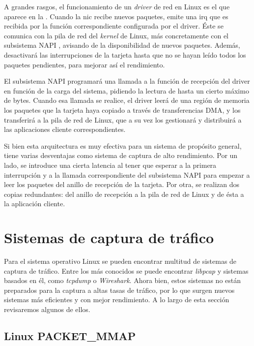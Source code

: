 \documentclass[oneside, draft]{epstfg}
\begin{document}
A grandes rasgos, el funcionamiento de un \textit{\gls{driver}} de red en Linux es el que aparece en la . Cuando la \gls{nic} recibe nuevos paquetes, emite una \gls{irq} que es recibida por la función correspondiente configurada por el \gls{driver}. Éste se comunica con la pila de red del \textit{kernel} de Linux, más concretamente con el subsistema \gls{NAPI} \cite{NAPI}, avisando de la disponibilidad de nuevos paquetes. Además, desactivará las interrupciones de la tarjeta hasta que no se hayan leído todos los paquetes pendientes, para mejorar así el rendimiento.

El subsistema \gls{NAPI} programará una llamada a la función de recepción del \gls{driver} en función de la carga del sistema, pidiendo la lectura de hasta un cierto máximo de bytes. Cuando esa llamada se realice, el \gls{driver} leerá de una región de memoria los paquetes que la tarjeta haya copiado a través de transferencias DMA, y los transferirá a la pila de red de Linux, que a su vez los gestionará y distribuirá a las aplicaciones cliente correspondientes.

Si bien esta arquitectura es muy efectiva para un sistema de propósito general, tiene varias desventajas como sistema de captura de alto rendimiento. Por un lado, se introduce una cierta latencia al tener que esperar a la primera interrupción y a la llamada correspondiente del subsistema NAPI para empezar a leer los paquetes del anillo de recepción de la tarjeta. Por otra, se realizan dos copias redundantes: del anillo de recepción a la pila de red de Linux y de ésta a la aplicación cliente.

\section{Sistemas de captura de tráfico}

Para el sistema operativo Linux se pueden encontrar multitud de sistemas de captura de tráfico. Entre los más conocidos se puede encontrar \textit{libpcap} y sistemas basados en él, como \textit{tcpdump} o \textit{Wireshark}. Ahora bien, estos sistemas no están preparados para la captura a altas tasas de tráfico, por lo que surgen nuevos sistemas más eficientes y con mejor rendimiento. A lo largo de esta sección revisaremos algunos de ellos.

\subsection{Linux PACKET\_MMAP}
\end{document}
